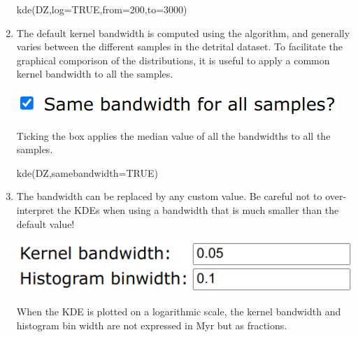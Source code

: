 \begin{refsection}
\begin{enumerate}
\begin{console}
kde(DZ,log=TRUE,from=200,to=3000)
\end{console}

\item The default kernel bandwidth is computed using the
  \citet{botev2010} algorithm, and generally varies between the
  different samples in the detrital dataset. To facilitate the
  graphical comporison of the distributions, it is useful to apply a
  common kernel bandwidth to all the samples.

\noindent\begin{minipage}[t]{.35\linewidth}
\strut\vspace*{-\baselineskip}\newline
\includegraphics[width=\linewidth]{../figures/detritalKDEsamebandwidth.png}
\end{minipage}
\begin{minipage}[t]{.65\linewidth}
  Ticking the box applies the median value of all the
  \citet{botev2010} bandwidths to all the samples.
\end{minipage}

\begin{console}
kde(DZ,samebandwidth=TRUE)
\end{console}

\item The \citet{botev2010} bandwidth can be replaced by any custom
  value.  Be careful not to over-interpret the KDEs when using a
  bandwidth that is much smaller than the default value!

\noindent\begin{minipage}[t]{.4\linewidth}
  \strut\vspace*{-\baselineskip}\newline
  \includegraphics[width=\linewidth]{../figures/detritalKDEcustombandwidth.png}
\end{minipage}
\begin{minipage}[t]{.6\linewidth}
  When the KDE is plotted on a logarithmic scale, the kernel bandwidth
  and histogram bin width are not expressed in Myr but as fractions.
\end{minipage}


\end{enumerate}
\end{refsection}
